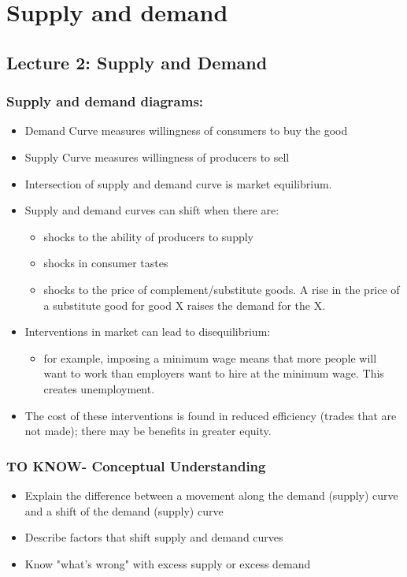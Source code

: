\documentclass{article}
\begin{document}
\section{Supply and demand}

\subsection{Lecture 2: Supply and Demand}

\subsubsection{Supply and demand diagrams:}

\begin{itemize}
\item Demand Curve measures willingness of consumers to buy the good 
\item Supply Curve measures willingness of producers to sell 
\item Intersection of supply and demand curve is market equilibrium. 
\item Supply and demand curves can shift when there are:
\begin{itemize}
\item shocks to the ability of producers to supply 
\item shocks in consumer tastes 
\item shocks to the price of complement/substitute goods. A rise in the price of a substitute good for good X raises the demand for the X. 
\end{itemize}
\item Interventions in market can lead to disequilibrium:
\begin{itemize}
\item for example, imposing a minimum wage means that more people will want to work than employers want to hire at the minimum wage. This creates unemployment. 
\end{itemize}
\item The cost of these interventions is found in reduced efficiency (trades that are not made); there may be benefits in greater equity. 
\end{itemize}

\subsubsection{TO KNOW- Conceptual Understanding}
\begin{itemize}
\item Explain the difference between a movement along the demand (supply) curve and a shift of the demand (supply) curve 
\item Describe factors that shift supply and demand curves 
\item Know "what's wrong" with excess supply or excess demand 
\end{itemize}
\end{document}
